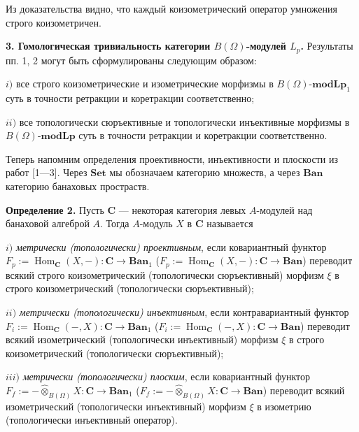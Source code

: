 \documentclass[11pt,twoside]{article}
\begin{document}
Из доказательства видно, что каждый коизометрический оператор умножения строго коизометричен. 



























\textbf{3. Гомологическая тривиальность категории $B(\Omega)$-модулей $L_p$.} Результаты пп. 1, 2 могут быть сформулированы следующим образом:


$i)$ все строго коизометрические и изометрические морфизмы в $B(\Omega)$-$\mathbf{modLp}_1$ суть в точности ретракции и коретракции соответственно;

$ii)$ все топологически сюръективные и топологически инъективные морфизмы в $B(\Omega)$-$\mathbf{modLp}$ суть в точности ретракции и коретракции соответственно.

Теперь напомним определения проективности, инъективности и плоскости из работ [1---3]. Через $\mathbf{Set}$ мы обозначаем категорию множеств, а через $\mathbf{Ban}$ категорию банаховых простраств. 

\textbf{Определение 2.} Пусть $\mathbf{C}$ --- некоторая категория левых $A$-модулей над банаховой алгеброй $A$. Тогда $A$-модуль $X$ в $\mathbf{C}$ называется

$i)$ \textit{метрически (топологически) проективным}, если ковариантный функтор $F_p:=\operatorname{Hom}_{\mathbf{C}}(X,-):\mathbf{C}\to\mathbf{Ban}_1$ ($F_p:=\operatorname{Hom}_{\mathbf{C}}(X,-):\mathbf{C}\to\mathbf{Ban}$) переводит всякий строго коизометрический (топологически сюръективный) морфизм $\xi$ в строго коизометрический (топологически сюръективный);

$ii)$ \textit{метрически (топологически) инъективным}, если контравариантный функтор $F_i:=\operatorname{Hom}_{\mathbf{C}}(-,X):\mathbf{C}\to\mathbf{Ban}_1$ ($F_i:=\operatorname{Hom}_{\mathbf{C}}(-,X):\mathbf{C}\to\mathbf{Ban}$) переводит всякий изометрический (топологически инъективный) морфизм $\xi$ в строго коизометрический (топологически сюръективный);

$iii)$ \textit{метрически (топологически) плоским}, если ковариантный функтор $F_f:=-\widehat{\otimes}_{B(\Omega)}X:\mathbf{C}\to\mathbf{Ban}_1$ ($F_f:=-\widehat{\otimes}_{B(\Omega)}X:\mathbf{C}\to\mathbf{Ban}$) переводит всякий изометрический (топологически инъективный) морфизм $\xi$ в изометрию (топологически инъективный оператор).
\end{document}
